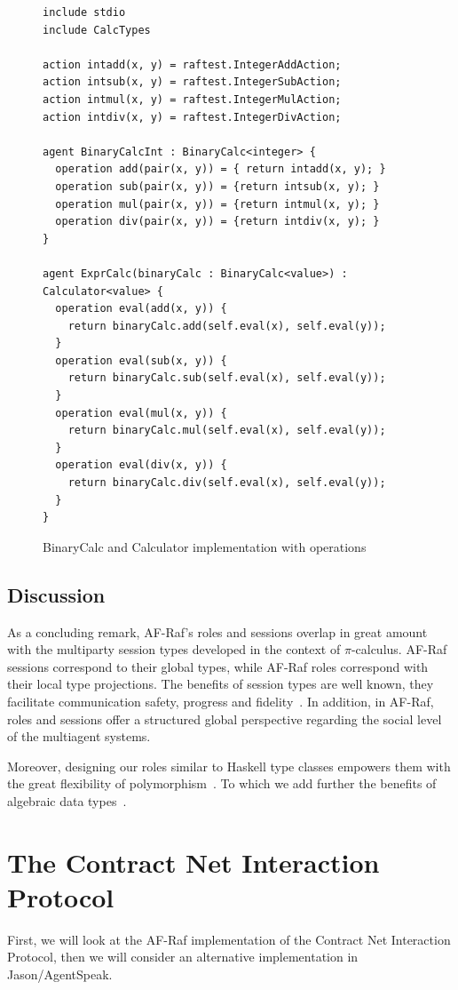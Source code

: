 \documentclass[a4paper,12pt,oneside,fleqn]{book} %
\begin{document}
\begin{figure}\footnotesize %
\begin{verbatim}
include stdio
include CalcTypes

action intadd(x, y) = raftest.IntegerAddAction;
action intsub(x, y) = raftest.IntegerSubAction;
action intmul(x, y) = raftest.IntegerMulAction;
action intdiv(x, y) = raftest.IntegerDivAction;

agent BinaryCalcInt : BinaryCalc<integer> {
  operation add(pair(x, y)) = { return intadd(x, y); }
  operation sub(pair(x, y)) = {return intsub(x, y); }
  operation mul(pair(x, y)) = {return intmul(x, y); }
  operation div(pair(x, y)) = {return intdiv(x, y); }
}

agent ExprCalc(binaryCalc : BinaryCalc<value>) : Calculator<value> {
  operation eval(add(x, y)) {
    return binaryCalc.add(self.eval(x), self.eval(y));
  }
  operation eval(sub(x, y)) {
    return binaryCalc.sub(self.eval(x), self.eval(y));
  }
  operation eval(mul(x, y)) {
    return binaryCalc.mul(self.eval(x), self.eval(y));
  }
  operation eval(div(x, y)) {
    return binaryCalc.div(self.eval(x), self.eval(y));
  }
}
\end{verbatim}
\caption{BinaryCalc and Calculator implementation with operations}
\label{fig:calc-op}
\end{figure} %
\subsection{Discussion} %
As a concluding remark, AF-Raf's roles and sessions overlap in great amount
with the multiparty session types developed in the context of
$\pi$-calculus. AF-Raf sessions correspond to their global types, while
AF-Raf roles correspond with their local type projections. The benefits of
session types are well known, they facilitate communication safety,
progress and fidelity~\cite{dblp:conf/popl/hondayc08}. In addition, in
AF-Raf, roles and sessions offer a structured global perspective regarding
the social level of the multiagent systems.

Moreover, designing our roles similar to Haskell type classes empowers them
with the great flexibility of polymorphism~\cite{DBLP:conf/popl/WadlerB89}.
To which we add further the benefits of algebraic data
types~\cite{DBLP:journals/acta/GuttagH78}.
\section{The Contract Net Interaction Protocol}\label{sc:contractNet} %
First, we will look at the AF-Raf implementation of the Contract Net
Interaction Protocol, then we will consider an alternative implementation
in Jason/AgentSpeak.
\end{document}
